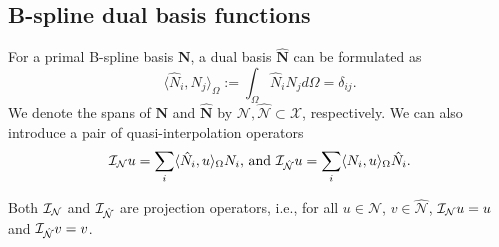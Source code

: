 \subsection{B-spline dual basis functions}
For a primal B-spline basis $\mathbf{N}$, a dual basis $\hat{\mathbf{N}}$ can be formulated as
\begin{equation}
	\langle\hat{N}_i,N_j\rangle_\Omega:=\int_\Omega\hat{N}_iN_jd\Omega=\delta_{ij}.
\end{equation}
We denote the spans of ${\mathbf{N}}$ and $\hat{\mathbf{N}}$ by $\mathcal{N},\hat{\mathcal{N}}\subset\mathcal{X}$, respectively. We can also introduce a pair of quasi-interpolation operators
\begin{equation}
	\mathcal{I}_\mathcal{N}u = \sum_i\langle{\hat{N}_i,u}\rangle_\Omega{N}_i\text{, and }\mathcal{I}_{\hat{\mathcal{N}}}u = \sum_i\langle{{N}_i,u}\rangle_\Omega\hat{N}_i.\label{eq:quasi-interpolation-operators}
\end{equation}
\begin{remark}
	Both $\mathcal{I}_\mathcal{N}$ and $\mathcal{I}_{\hat{\mathcal{N}}}$ are projection operators, i.e., for all $u\in\mathcal{N}$, $v\in\hat{\mathcal{N}}$, $\mathcal{I}_\mathcal{N}u=u$ and $\mathcal{I}_{\hat{\mathcal{N}}}v=v$.
\end{remark}


